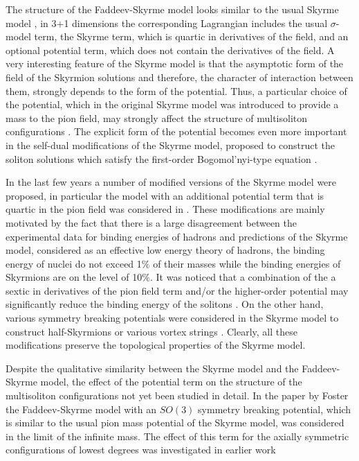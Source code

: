 \documentclass[12pt,a4paper]{article}
\begin{document}
The structure of the Faddeev-Skyrme model looks similar to the usual Skyrme model \cite{skyrme1,skyrme2},
in 3+1 dimensions the corresponding Lagrangian includes the usual $\sigma$-model term, the Skyrme term,
which is quartic in derivatives of the field, and an optional potential term, which does not contain the derivatives of the field.
A very interesting feature of the Skyrme model  is that
the asymptotic form of the field of the Skyrmion solutions and therefore, the character of interaction
between them,  strongly depends to the form of the
potential. Thus, a particular choice of the potential, which in the original Skyrme model
was introduced to provide a mass to the pion field, may strongly affect the structure of multisoliton configurations
\cite{Battye:2004rw,Battye:2009ad}. The explicit form of the potential becomes even more important in the
self-dual modifications of the Skyrme model, proposed to construct the soliton solutions which satisfy
the first-order Bogomol'nyi-type equation \cite{Adam:2010fg,Adam:2010ds,Sutcliffe:2010et}.

In the last few years a number of
modified versions of the Skyrme model were proposed, in particular the model with an additional potential term
that is quartic in the pion field was considered in \cite{Gillard:2015eia}.
These modifications are mainly motivated by the fact that there is a
large disagreement between the experimental data
for binding energies of hadrons and predictions of the Skyrme model, considered as an effective low energy theory
of hadrons, the binding energy of nuclei do not exceed 1$\%$
of their masses while the binding energies of Skyrmions are on the level of 10$\%$.
It was noticed that a combination of the
a sextic in derivatives of the pion field term and/or
the higher-order potential may significantly reduce the binding energy of the
solitons \cite{Gudnason:2016tiz,Gudnason:2016cdo}.
On the other hand, various symmetry breaking potentials were considered in the Skyrme model to construct
half-Skyrmions \cite{Gudnason:2015nxa} or various vortex strings \cite{Gudnason:2016yix}. Clearly, all these modifications
preserve the topological properties of the Skyrme model.

Despite the qualitative similarity between the Skyrme model and the Faddeev-Skyrme model, the effect of the potential term
on the structure of the multisoliton configurations not yet been studied in detail.
In the
paper by Foster \cite{Foster:2010zb} the Faddeev-Skyrme model with an $SO(3)$ symmetry breaking potential,
which is similar to the usual pion
mass potential of the Skyrme model, was considered in the limit of the infinite mass. The effect of this term
for the axially symmetric configurations of lowest degrees was investigated in earlier work \cite{Kundu:1982bc}
\end{document}
